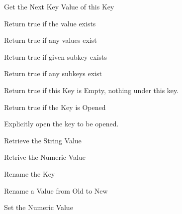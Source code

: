 
Get the Next Key Value of this Key


\label{wxregkeyhasvalue}


Return true if the value exists


\label{wxregkeyhasvalues}


Return true if any values exist


\label{wxregkeyhassubkey}


Return true if given subkey exists


\label{wxregkeyhassubkeys}


Return true if any subkeys exist


\label{wxregkeyisempty}


Return true if this Key is Empty, nothing under this key.


\label{wxregkeyisopened}


Return true if the Key is Opened


\label{wxregkeyopen}


Explicitly open the key to be opened.


\label{wxregkeyqueryvalue}


Retrieve the String Value


Retrive the Numeric Value


\label{wxregkeyrename}


Rename the Key


\label{wxregkeyrenamevalue}


Rename a Value from Old to New


\label{wxregkeysetvalue}


Set the Numeric Value
